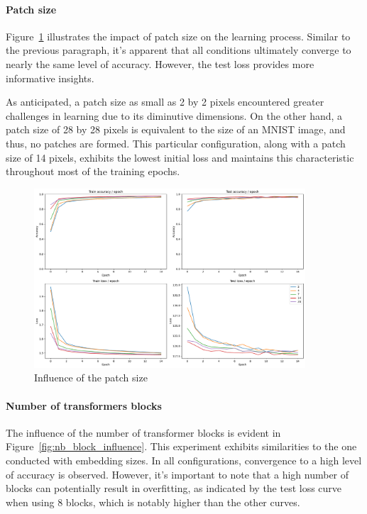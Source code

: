 \paragraph{Patch size}
Figure~\ref{fig:patch_size_influence} illustrates the impact of patch size on the learning process. Similar to the previous paragraph, it's apparent that all conditions ultimately converge to nearly the same level of accuracy. However, the test loss provides more informative insights.

As anticipated, a patch size as small as 2 by 2 pixels encountered greater challenges in learning due to its diminutive dimensions. On the other hand, a patch size of 28 by 28 pixels is equivalent to the size of an MNIST image, and thus, no patches are formed. This particular configuration, along with a patch size of 14 pixels, exhibits the lowest initial loss and maintains this characteristic throughout most of the training epochs.

\begin{figure}[H]
    \centering
    \includegraphics*[width=0.9\textwidth]{figs/Transformers/patch_size_influence.pdf}
    \caption{Influence of the patch size}
    \label{fig:patch_size_influence}
\end{figure}

\paragraph{Number of transformers blocks}
The influence of the number of transformer blocks is evident in Figure~\ref{fig:nb_block_influence}. This experiment exhibits similarities to the one conducted with embedding sizes. In all configurations, convergence to a high level of accuracy is observed. However, it's important to note that a high number of blocks can potentially result in overfitting, as indicated by the test loss curve when using 8 blocks, which is notably higher than the other curves.

